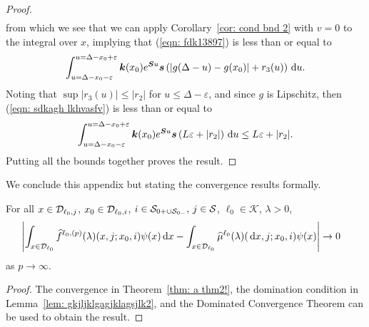 \begin{proof}
\begin{align}
 	\end{align}
 	from which we see that we can apply Corollary~\ref{cor: cond bnd 2} with \(v=0\) to the integral over \(x\), implying that (\ref{eqn: fdk13897}) is less than or equal to
 	\begin{align}
 		\int_{u=\Delta-x_0-\varepsilon}^{u=\Delta-x_0+\varepsilon} \boldsymbol k(x_0) e^{\boldsymbol Su}\boldsymbol s\left(|g(\Delta-u)-g(x_0)|+r_3(u)\right)\, \mathrm{d} u. \label{eqn: sdkagh lkhvasfv}
 	\end{align}
 	Noting that \(\sup |r_3(u)|\leq|r_2|\) for \(u\leq \Delta-\varepsilon\), and since \(g\) is Lipschitz, then (\ref{eqn: sdkagh lkhvasfv}) is less than or equal to 
 	\begin{align}
 		\int_{u=\Delta-x_0-\varepsilon}^{u=\Delta-x_0+\varepsilon} \boldsymbol k(x_0) e^{\boldsymbol Su}\boldsymbol s\left(L\varepsilon+|r_2|\right)\, \mathrm{d} u \leq L\varepsilon+|r_2|. \label{eqn: sdkagh lsfv}
 	\end{align}
 	Putting all the bounds together proves the result. 
 \end{proof}

We conclude this appendix but stating the convergence results formally. 
\begin{lem} \label{lem:vn42a}
	For all \(x\in\mathcal{D}_{\ell_0,j}\), \(x_0\in\mathcal{D}_{\ell_0,i}\), \(i\in\mathcal{S}_{0+\cup\mathcal{S}_{0-}},\,j\in\mathcal{S}\), \(\ell_0\in\mathcal K\), \(\lambda > 0\),  
	\begin{align}
		&\left|\int_{x\in\mathcal{D}_{\ell_0}}\widehat f^{\ell_0,(p)}(\lambda)(x,j;x_0,i)\psi(x) \, \mathrm{d} x - \int_{x\in\mathcal{D}_{\ell_0}}\widehat \mu^{\ell_0}(\lambda)(\, \mathrm{d} x,j; x_0,i)\psi(x) \right|\to 0  \label{eqn: akhv2a}
	\end{align}
	as \(p\to\infty\). 
\end{lem}
\begin{proof}
	The convergence in Theorem~\ref{thm: a thm2!}, the domination condition in Lemma~\ref{lem: gkjljklgagjklagsjlk2}, and the Dominated Convergence Theorem can be used to obtain the result. 
\end{proof}
	
